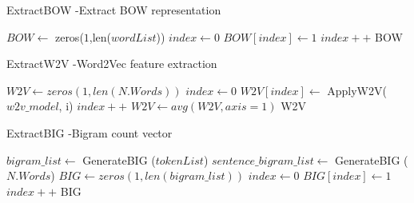 \documentclass[author-year, review]{elsarticle} %
\begin{document}
 \begin{algorithm}[H]
\caption{ExtractBOW -Extract BOW representation}\label{alg:minerpattern}
\begin{algorithmic}[1]
\State $ BOW \gets $ zeros($1$,len($wordList$))
\State $index \gets 0$
\State $BOW[index] \gets 1$
\EndIf
\State $index++$
\EndForeach
\State\Return BOW
\EndProcedure
\end{algorithmic}
\end{algorithm}


 \begin{algorithm}[H]
\caption{ExtractW2V -Word2Vec feature extraction }\label{alg:minerpattern}
\begin{algorithmic}[1]
\State $W2V \gets zeros(1,len(N.Words))$
\State $index \gets 0$
\State $W2V[index] \gets $ ApplyW2V($w2v\_model$, i)
\State $index++$
\EndForeach
\State $W2V \gets avg(W2V, axis=1) $ 
\State\Return W2V
\EndProcedure
\end{algorithmic}
\end{algorithm}


 \begin{algorithm}[H]
\caption{ExtractBIG -Bigram count vector}\label{alg:minerpattern}
\begin{algorithmic}[1]
\State $ bigram\_list \gets $ GenerateBIG ($tokenList$)
\State $ sentence\_bigram\_list \gets $ GenerateBIG ($N.Words$)
\State $BIG \gets zeros(1,len(bigram\_list))$
\State $index \gets 0$
  \State $BIG[index] \gets 1$
\EndIf \State $index++$
\EndForeach \State\Return BIG
\EndProcedure
\end{algorithmic}
\end{algorithm}
\end{document}
